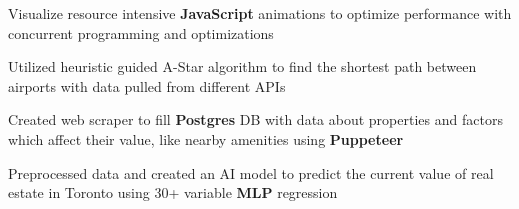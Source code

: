 \documentclass[letterpaper]{deedy-resume} %
\begin{document}
\begin{minipage}[t]{0.66\textwidth}
\begin{tightitemize}
\end{tightitemize}

\sectionspace

\begin{tightitemize}

\item Visualize resource intensive \textbf{JavaScript} animations to optimize performance with concurrent programming and optimizations

\item Utilized heuristic guided A-Star algorithm to find the shortest path between airports with data pulled from different APIs

\end{tightitemize}

\sectionspace

\begin{tightitemize}


\item Created web scraper to fill \textbf{Postgres} DB  with data about properties and factors which affect their value, like nearby amenities using \textbf{Puppeteer}
\item Preprocessed data and created an AI model to predict the current value of real estate in Toronto using 30+ variable \textbf{MLP} regression

\end{tightitemize}






\end{minipage}
\end{document}
